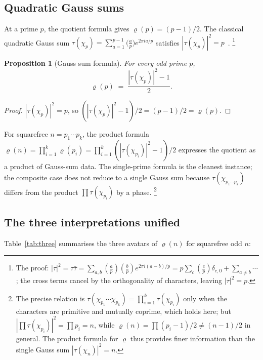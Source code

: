 \documentclass[12pt]{amsart}
\theoremstyle{bluehead}
\newtheorem{proposition}[theorem]{Proposition}
\theoremstyle{orangehead}
\theoremstyle{greenhead}
\begin{document}
\subsection*{Quadratic Gauss sums}

At a prime $p$, the quotient formula gives $\varrho(p)=(p-1)/2$.
The classical quadratic Gauss sum
$\tau(\chi_p)=\sum_{a=1}^{p-1}\bigl(\tfrac{a}{p}\bigr)e^{2\pi ia/p}$
satisfies $|\tau(\chi_p)|^2=p$~\cite{ireland1990}.%
\footnote{The proof: $|\tau|^2=\tau\bar\tau=\sum_{a,b}(\frac{a}{p})(\frac{b}{p})e^{2\pi i(a-b)/p}=p\sum_{c}(\frac{c}{p})\delta_{c,0}+\sum_{a\ne b}\cdots$; the cross terms cancel by the orthogonality of characters, leaving $|\tau|^2=p$.}

\begin{proposition}[Gauss sum formula]\label{prop:gauss}
  For every odd prime $p$,
  \[
    \varrho(p)\;=\;\frac{|\tau(\chi_p)|^2-1}{2}.
  \]
\end{proposition}

\begin{proof}
  $|\tau(\chi_p)|^2=p$, so $(|\tau(\chi_p)|^2-1)/2=(p-1)/2=\varrho(p)$.
\qedhere
\end{proof}

For squarefree $n=p_1\cdots p_k$, the product formula
$\varrho(n)=\prod_{i=1}^k\varrho(p_i)=\prod_{i=1}^k(|\tau(\chi_{p_i})|^2-1)/2$
expresses the quotient as a product of Gauss-sum data.
The single-prime formula is the cleanest instance; the composite case
does not reduce to a single Gauss sum because $\tau(\chi_{p_1\cdots p_k})$
differs from the product $\prod\tau(\chi_{p_i})$ by a phase.%
\footnote{The precise relation is $\tau(\chi_{p_1}\cdots\chi_{p_k})=\prod_{i=1}^k\tau(\chi_{p_i})$
  only when the characters are primitive and mutually coprime, which holds
  here; but $|\prod\tau(\chi_{p_i})|^2=\prod p_i=n$, while $\varrho(n)=\prod(p_i-1)/2\ne(n-1)/2$
  in general.  The product formula for $\varrho$ thus provides finer
  information than the single Gauss sum $|\tau(\chi_n)|^2=n$.}

\subsection*{The three interpretations unified}

Table~\ref{tab:three} summarises the three avatars of $\varrho(n)$
for squarefree odd $n$:
\end{document}
